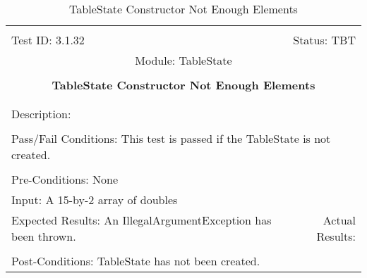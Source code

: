 \documentclass[titlepage]{article}
\begin{document}
\begin{center}%
\begin{table}
\begin{tabular}{|l r|}\hline&\\[-2mm]
	Test ID: 3.1.32	&Status: TBT\\[-3mm]
	\multicolumn{2}{|c|}{Module: TableState}\\&\\
	\multicolumn{2}{|c|}{\textbf{\large{TableState Constructor Not Enough Elements}}}\\&\\\hline&\\[-3mm]
	\multicolumn{2}{|p{\textwidth}|}{Description: }\\[1mm]\hline&\\[-3mm]
	\multicolumn{2}{|p{\textwidth}|}{Pass/Fail Conditions: This test is passed if the TableState is not created.}\\[1mm]\hline&\\[-3mm]
	\multicolumn{2}{|p{\textwidth}|}{Pre-Conditions: None}\\[4mm]
	\multicolumn{2}{|p{\textwidth}|}{Input: A 15-by-2 array of doubles}\\[2mm]\hline
	\multicolumn{1}{|p{0.49\textwidth}}{Expected Results: An IllegalArgumentException has been thrown.}	&\multicolumn{1}{|p{0.45\textwidth}|}{Actual Results: }\\\hline&\\[-3mm]
	\multicolumn{2}{|p{\textwidth}|}{Post-Conditions: TableState has not been created.}\\\hline
\end{tabular}
\caption{TableState Constructor Not Enough Elements}
\end{table}
\end{center}
\end{document}
